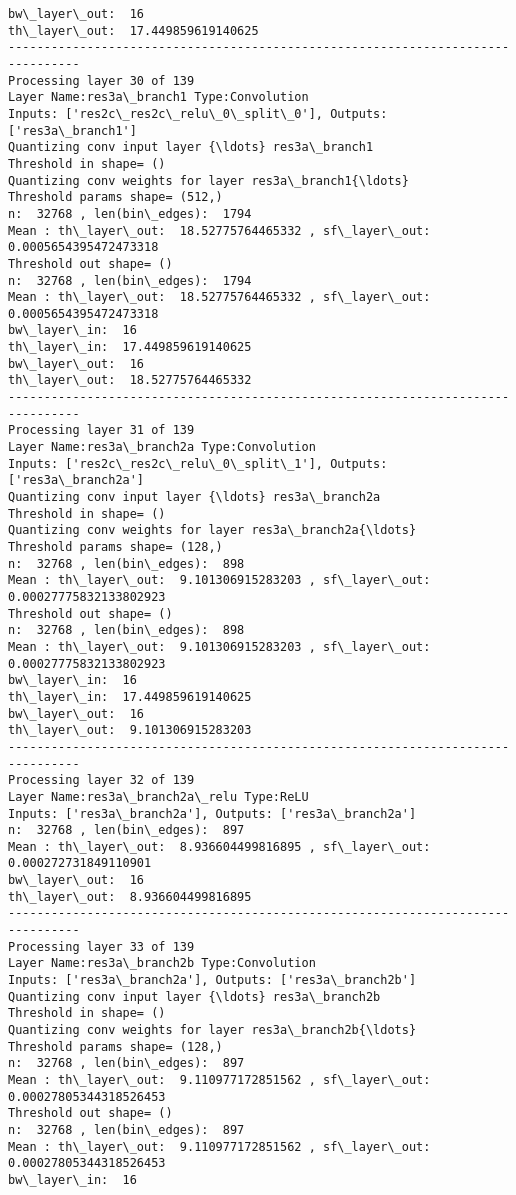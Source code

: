 \documentclass[11pt]{article}
\begin{document}
\begin{Verbatim}[commandchars=\\\{\}]
bw\_layer\_out:  16
th\_layer\_out:  17.449859619140625
--------------------------------------------------------------------------------
Processing layer 30 of 139
Layer Name:res3a\_branch1 Type:Convolution
Inputs: ['res2c\_res2c\_relu\_0\_split\_0'], Outputs: ['res3a\_branch1']
Quantizing conv input layer {\ldots} res3a\_branch1
Threshold in shape= ()
Quantizing conv weights for layer res3a\_branch1{\ldots}
Threshold params shape= (512,)
n:  32768 , len(bin\_edges):  1794
Mean : th\_layer\_out:  18.52775764465332 , sf\_layer\_out:  0.0005654395472473318
Threshold out shape= ()
n:  32768 , len(bin\_edges):  1794
Mean : th\_layer\_out:  18.52775764465332 , sf\_layer\_out:  0.0005654395472473318
bw\_layer\_in:  16
th\_layer\_in:  17.449859619140625
bw\_layer\_out:  16
th\_layer\_out:  18.52775764465332
--------------------------------------------------------------------------------
Processing layer 31 of 139
Layer Name:res3a\_branch2a Type:Convolution
Inputs: ['res2c\_res2c\_relu\_0\_split\_1'], Outputs: ['res3a\_branch2a']
Quantizing conv input layer {\ldots} res3a\_branch2a
Threshold in shape= ()
Quantizing conv weights for layer res3a\_branch2a{\ldots}
Threshold params shape= (128,)
n:  32768 , len(bin\_edges):  898
Mean : th\_layer\_out:  9.101306915283203 , sf\_layer\_out:  0.00027775832133802923
Threshold out shape= ()
n:  32768 , len(bin\_edges):  898
Mean : th\_layer\_out:  9.101306915283203 , sf\_layer\_out:  0.00027775832133802923
bw\_layer\_in:  16
th\_layer\_in:  17.449859619140625
bw\_layer\_out:  16
th\_layer\_out:  9.101306915283203
--------------------------------------------------------------------------------
Processing layer 32 of 139
Layer Name:res3a\_branch2a\_relu Type:ReLU
Inputs: ['res3a\_branch2a'], Outputs: ['res3a\_branch2a']
n:  32768 , len(bin\_edges):  897
Mean : th\_layer\_out:  8.936604499816895 , sf\_layer\_out:  0.000272731849110901
bw\_layer\_out:  16
th\_layer\_out:  8.936604499816895
--------------------------------------------------------------------------------
Processing layer 33 of 139
Layer Name:res3a\_branch2b Type:Convolution
Inputs: ['res3a\_branch2a'], Outputs: ['res3a\_branch2b']
Quantizing conv input layer {\ldots} res3a\_branch2b
Threshold in shape= ()
Quantizing conv weights for layer res3a\_branch2b{\ldots}
Threshold params shape= (128,)
n:  32768 , len(bin\_edges):  897
Mean : th\_layer\_out:  9.110977172851562 , sf\_layer\_out:  0.00027805344318526453
Threshold out shape= ()
n:  32768 , len(bin\_edges):  897
Mean : th\_layer\_out:  9.110977172851562 , sf\_layer\_out:  0.00027805344318526453
bw\_layer\_in:  16

\end{Verbatim}
\end{document}
